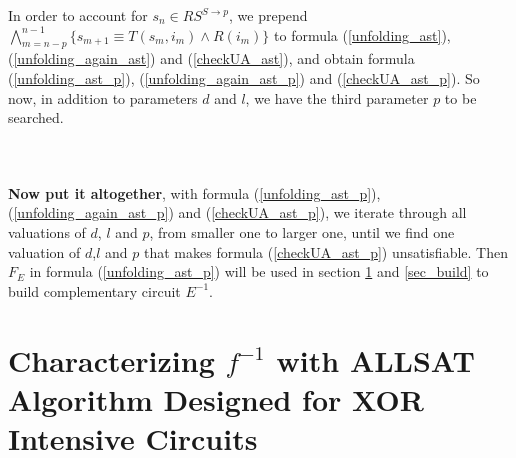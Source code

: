 \documentclass[journal]{IEEEtran}
\begin{document}
In order to account for $s_n\in RS^{S\to p}$,
we prepend $\bigwedge_{m=n-p}^{n-1}\big\{s_{m+1}\equiv T(s_m,i_m)\wedge R(i_m)\big\}$ to formula (\ref{unfolding_ast}),(\ref{unfolding_again_ast}) and (\ref{checkUA_ast}),
and obtain formula (\ref{unfolding_ast_p}), (\ref{unfolding_again_ast_p}) and (\ref{checkUA_ast_p}).
So now, in addition to parameters $d$ and $l$,
we have the third parameter $p$ to be searched.

\begin{equation}\label{unfolding_ast_p}
\end{equation}

\begin{equation}\label{unfolding_again_ast_p}
\end{equation}

\begin{equation}\label{checkUA_ast_p}
\end{equation}

\textbf{Now put it altogether},
with formula (\ref{unfolding_ast_p}), (\ref{unfolding_again_ast_p}) and (\ref{checkUA_ast_p}),
we iterate through all valuations of $d$, $l$ and $p$,
from smaller one to larger one,
until we find one valuation of $d$,$l$ and $p$ that makes formula (\ref{checkUA_ast_p}) unsatisfiable.
Then $F_E$ in formula (\ref{unfolding_ast_p}) will be used in section \ref{sec_buildF} and \ref{sec_build} to build complementary circuit $E^{-1}$.

\section{Characterizing $f^{-1}$ with ALLSAT Algorithm Designed for XOR Intensive Circuits}\label{sec_buildF}
\end{document}
